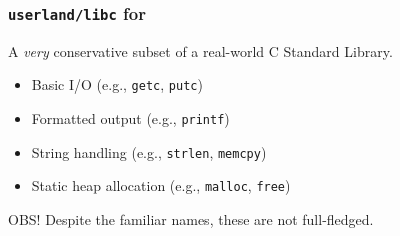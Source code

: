 \begin{frame}

\frametitle{\texttt{userland/libc} for \kudos{}}

\vspace{\fill}

\begin{center}

A \emph{very} conservative subset of a real-world C Standard Library.

\end{center}

\vspace{\fill}

\begin{itemize}

\item Basic I/O (e.g., \texttt{getc}, \texttt{putc})

\item Formatted output (e.g., \texttt{printf})

\item String handling (e.g., \texttt{strlen}, \texttt{memcpy})

\item Static heap allocation (e.g., \texttt{malloc}, \texttt{free})

\end{itemize}

\vspace{\fill}

\begin{center}

OBS! Despite the familiar names, these are not full-fledged.

\end{center}

\vspace{\fill}

\end{frame}
